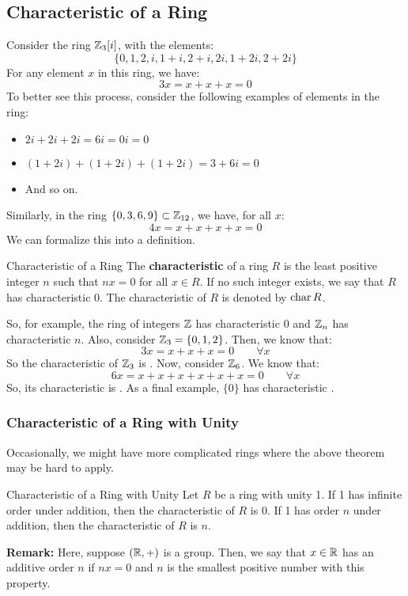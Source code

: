 \documentclass[letterpaper]{article}
\begin{document}
\subsection{Characteristic of a Ring}
Consider the ring $\mathbb{Z}_{3}[i]$, with the elements:
\[\{0, 1, 2, i, 1 + i, 2 + i, 2i, 1 + 2i, 2 + 2i\}\]
For any element $x$ in this ring, we have: 
\[3x = x + x + x = 0\]
To better see this process, consider the following examples of elements in the ring:
\begin{itemize}
    \item $2i + 2i + 2i = 6i = 0i = 0$
    \item $(1 + 2i) + (1 + 2i) + (1 + 2i) = 3 + 6i = 0$
    \item And so on.
\end{itemize}
Similarly, in the ring $\{0, 3, 6, 9\} \subset \mathbb{Z}_{12}$, we have, for all $x$: 
\[4x = x + x + x + x = 0\]
We can formalize this into a definition. 
\begin{definition}{Characteristic of a Ring}{}
    The \textbf{characteristic} of a ring $R$ is the least positive integer $n$ such that $nx = 0$ for all $x \in R$. If no such integer exists, we say that $R$ has characteristic 0. The characteristic of $R$ is denoted by $\operatorname{char}{R}$.    
\end{definition}
So, for example, the ring of integers $\mathbb{Z}$ has characteristic 0 and $\mathbb{Z}_n$ has characteristic $n$. Also, consider $\mathbb{Z}_{3} = \{0, 1, 2\}$. Then, we know that:
\[3x = x + x + x = 0 \qquad \forall x\]
So the characteristic of $\mathbb{Z}_{3}$ is . Now, consider $\mathbb{Z}_{6}$. We know that:
\[6x = x + x + x + x + x + x = 0 \qquad \forall x\]
So, its characteristic is . As a final example, $\{0\}$ has characteristic .


\subsubsection{Characteristic of a Ring with Unity}
Occasionally, we might have more complicated rings where the above theorem may be hard to apply. 
\begin{theorem}{Characteristic of a Ring with Unity}{}
    Let $R$ be a ring with unity 1. If 1 has infinite order under addition, then the characteristic of $R$ is 0. If 1 has order $n$ under addition, then the characteristic of $R$ is $n$. 
\end{theorem}
\textbf{Remark:} Here, suppose $(\mathbb{R}, +)$ is a group. Then, we say that $x \in \mathbb{R}$ has an additive order $n$ if $nx = 0$ and $n$ is the smallest positive number with this property. 
\end{document}
